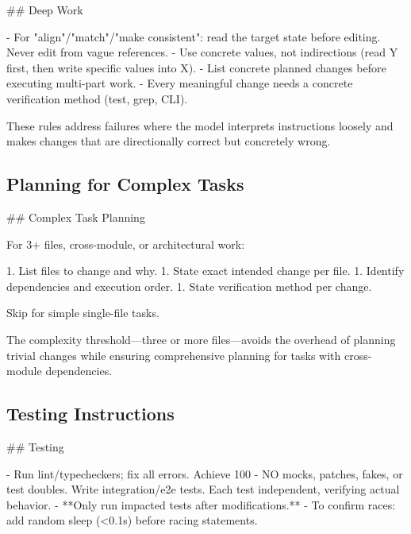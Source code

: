 \documentclass{article}
\begin{document}
\begin{prompt}
## Deep Work

- For "align"/"match"/"make consistent": read the target state before editing. Never edit from vague references.
- Use concrete values, not indirections (read Y first, then write specific values into X).
- List concrete planned changes before executing multi-part work.
- Every meaningful change needs a concrete verification method (test, grep, CLI).
\end{prompt}

These rules address failures where the model interprets instructions loosely and makes changes that are directionally correct but concretely wrong.

\subsection{Planning for Complex Tasks}
\label{app:planning}

\begin{prompt}
## Complex Task Planning

For 3+ files, cross-module, or architectural work:

1. List files to change and why.
1. State exact intended change per file.
1. Identify dependencies and execution order.
1. State verification method per change.

Skip for simple single-file tasks.
\end{prompt}

The complexity threshold---three or more files---avoids the overhead of planning trivial changes while ensuring comprehensive planning for tasks with cross-module dependencies.

\subsection{Testing Instructions}
\label{app:testing}

\begin{prompt}
## Testing

- Run lint/typecheckers; fix all errors. Achieve 100%
- NO mocks, patches, fakes, or test doubles. Write integration/e2e tests. Each test independent, verifying actual behavior.
- **Only run impacted tests after modifications.**
- To confirm races: add random sleep (<0.1s) before racing statements.
\end{prompt}
\end{document}
